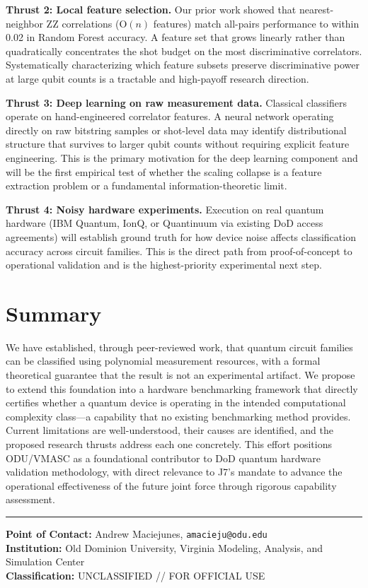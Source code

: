 \documentclass[11pt,twocolumn]{article}
\begin{document}
\textbf{Thrust 2: Local feature selection.} Our prior
work showed that nearest-neighbor ZZ correlations
(O$(n)$ features) match all-pairs performance to within
0.02 in Random Forest accuracy. A feature set that grows
linearly rather than quadratically concentrates the shot
budget on the most discriminative correlators.
Systematically characterizing which feature subsets
preserve discriminative power at large qubit counts is
a tractable and high-payoff research direction.

\textbf{Thrust 3: Deep learning on raw measurement data.}
Classical classifiers operate on hand-engineered
correlator features. A neural network operating directly
on raw bitstring samples or shot-level data may identify
distributional structure that survives to larger qubit
counts without requiring explicit feature engineering.
This is the primary motivation for the deep learning
component and will be the first empirical test of
whether the scaling collapse is a feature extraction
problem or a fundamental information-theoretic limit.

\textbf{Thrust 4: Noisy hardware experiments.} Execution
on real quantum hardware (IBM Quantum, IonQ, or
Quantinuum via existing DoD access agreements) will
establish ground truth for how device noise affects
classification accuracy across circuit families. This
is the direct path from proof-of-concept to operational
validation and is the highest-priority experimental
next step.

\section{Summary}

We have established, through peer-reviewed work, that
quantum circuit families can be classified using
polynomial measurement resources, with a formal
theoretical guarantee that the result is not an
experimental artifact. We propose to extend this
foundation into a hardware benchmarking framework that
directly certifies whether a quantum device is operating
in the intended computational complexity class---a
capability that no existing benchmarking method provides.
Current limitations are well-understood, their causes
are identified, and the proposed research thrusts
address each one concretely. This effort positions
ODU/VMASC as a foundational contributor to DoD quantum
hardware validation methodology, with direct relevance
to J7's mandate to advance the operational effectiveness
of the future joint force through rigorous capability
assessment.

\vspace{0.5em}
\noindent\rule{\linewidth}{0.4pt}
{\small
\textbf{Point of Contact:} Andrew Maciejunes,
\texttt{amacieju@odu.edu} \\
\textbf{Institution:} Old Dominion University,
Virginia Modeling, Analysis, and Simulation Center \\
\textbf{Classification:} UNCLASSIFIED // FOR OFFICIAL USE
}




\end{document}
